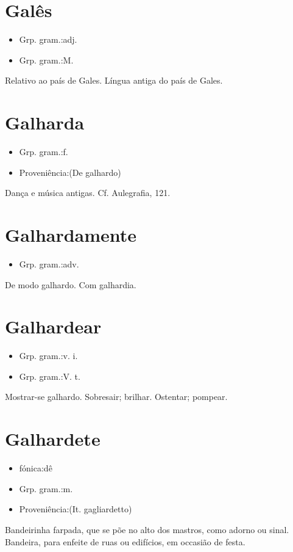 \section{Galês}
\begin{itemize}
\item {Grp. gram.:adj.}
\end{itemize}
\begin{itemize}
\item {Grp. gram.:M.}
\end{itemize}
Relativo ao país de Gales.
Língua antiga do país de Gales.
\section{Galharda}
\begin{itemize}
\item {Grp. gram.:f.}
\end{itemize}
\begin{itemize}
\item {Proveniência:(De \textunderscore galhardo\textunderscore )}
\end{itemize}
Dança e música antigas. Cf. \textunderscore Aulegrafia\textunderscore , 121.
\section{Galhardamente}
\begin{itemize}
\item {Grp. gram.:adv.}
\end{itemize}
De modo galhardo.
Com galhardia.
\section{Galhardear}
\begin{itemize}
\item {Grp. gram.:v. i.}
\end{itemize}
\begin{itemize}
\item {Grp. gram.:V. t.}
\end{itemize}
Mostrar-se galhardo.
Sobresair; brilhar.
Ostentar; pompear.
\section{Galhardete}
\begin{itemize}
\item {fónica:dê}
\end{itemize}
\begin{itemize}
\item {Grp. gram.:m.}
\end{itemize}
\begin{itemize}
\item {Proveniência:(It. \textunderscore gagliardetto\textunderscore )}
\end{itemize}
Bandeirinha farpada, que se põe no alto dos mastros, como adorno ou sinal.
Bandeira, para enfeite de ruas ou edifícios, em occasião de festa.
